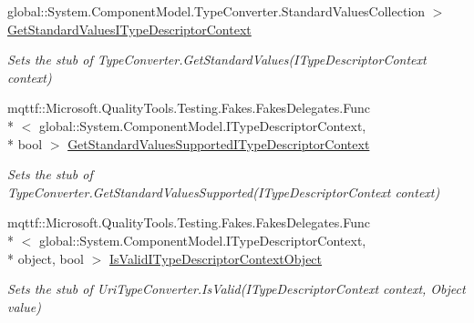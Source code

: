 \begin{DoxyCompactItemize}
global\-::\-System.\-Component\-Model.\-Type\-Converter.\-Standard\-Values\-Collection $>$ \hyperlink{class_system_1_1_fakes_1_1_stub_uri_type_converter_a6a9b4574e4e9067bfe9049fb08535d82}{Get\-Standard\-Values\-I\-Type\-Descriptor\-Context}
\begin{DoxyCompactList}\small\item\em Sets the stub of Type\-Converter.\-Get\-Standard\-Values(\-I\-Type\-Descriptor\-Context context)\end{DoxyCompactList}\item 
mqttf\-::\-Microsoft.\-Quality\-Tools.\-Testing.\-Fakes.\-Fakes\-Delegates.\-Func\\*
$<$ global\-::\-System.\-Component\-Model.\-I\-Type\-Descriptor\-Context, \\*
bool $>$ \hyperlink{class_system_1_1_fakes_1_1_stub_uri_type_converter_a5cb2f99783da179b332751b6ea60281f}{Get\-Standard\-Values\-Supported\-I\-Type\-Descriptor\-Context}
\begin{DoxyCompactList}\small\item\em Sets the stub of Type\-Converter.\-Get\-Standard\-Values\-Supported(\-I\-Type\-Descriptor\-Context context)\end{DoxyCompactList}\item 
mqttf\-::\-Microsoft.\-Quality\-Tools.\-Testing.\-Fakes.\-Fakes\-Delegates.\-Func\\*
$<$ global\-::\-System.\-Component\-Model.\-I\-Type\-Descriptor\-Context, \\*
object, bool $>$ \hyperlink{class_system_1_1_fakes_1_1_stub_uri_type_converter_a0bc22e2b38e0107789c9043262edb68e}{Is\-Valid\-I\-Type\-Descriptor\-Context\-Object}
\begin{DoxyCompactList}\small\item\em Sets the stub of Uri\-Type\-Converter.\-Is\-Valid(\-I\-Type\-Descriptor\-Context context, Object value)\end{DoxyCompactList}\end{DoxyCompactItemize}
